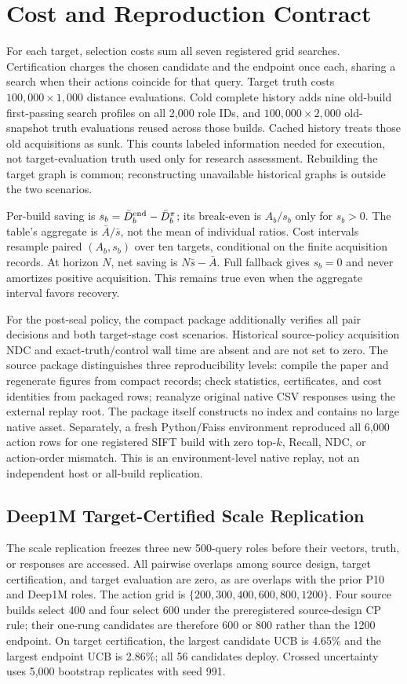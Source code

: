 \documentclass[sigconf,anonymous]{acmart}
\begin{document}
\section{Cost and Reproduction Contract}
For each target, selection costs sum all seven registered grid searches. Certification charges the chosen candidate and the endpoint once each, sharing a search when their actions coincide for that query. Target truth costs $100{,}000\times1{,}000$ distance evaluations. Cold complete history adds nine old-build first-passing search profiles on all 2,000 role IDs, and $100{,}000\times2{,}000$ old-snapshot truth evaluations reused across those builds. Cached history treats those old acquisitions as sunk. This counts labeled information needed for execution, not target-evaluation truth used only for research assessment. Rebuilding the target graph is common; reconstructing unavailable historical graphs is outside the two scenarios.

Per-build saving is $s_b=\bar D_b^{\rm end}-\bar D_b^{\pi}$; its break-even is $A_b/s_b$ only for $s_b>0$. The table's aggregate is $\bar A/\bar s$, not the mean of individual ratios. Cost intervals resample paired $(A_b,s_b)$ over ten targets, conditional on the finite acquisition records. At horizon $N$, net saving is $N\bar s-\bar A$. Full fallback gives $s_b=0$ and never amortizes positive acquisition. This remains true even when the aggregate interval favors recovery.

For the post-seal policy, the compact package additionally verifies all pair decisions and both target-stage cost scenarios. Historical source-policy acquisition NDC and exact-truth/control wall time are absent and are not set to zero. The source package distinguishes three reproducibility levels: compile the paper and regenerate figures from compact records; check statistics, certificates, and cost identities from packaged rows; reanalyze original native CSV responses using the external replay root. The package itself constructs no index and contains no large native asset. Separately, a fresh Python/Faiss environment reproduced all 6,000 action rows for one registered SIFT build with zero top-$k$, Recall, NDC, or action-order mismatch. This is an environment-level native replay, not an independent host or all-build replication.

\subsection{Deep1M Target-Certified Scale Replication}
The scale replication freezes three new 500-query roles before their vectors, truth, or responses are accessed. All pairwise overlaps among source design, target certification, and target evaluation are zero, as are overlaps with the prior P10 and Deep1M roles. The action grid is $\{200,300,400,600,800,1200\}$. Four source builds select 400 and four select 600 under the preregistered source-design CP rule; their one-rung candidates are therefore 600 or 800 rather than the 1200 endpoint. On target certification, the largest candidate UCB is 4.65\% and the largest endpoint UCB is 2.86\%; all 56 candidates deploy. Crossed uncertainty uses 5,000 bootstrap replicates with seed 991.
\end{document}
